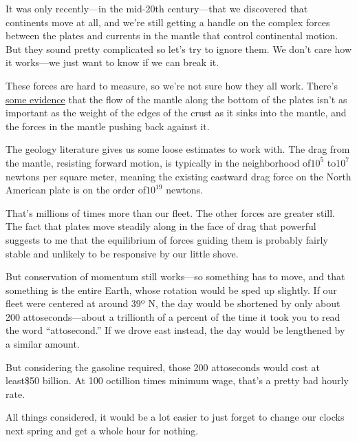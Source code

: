 {It was only recently—in the mid-20th century—that we discovered that continents move at all, and we’re still getting a handle on the complex forces between the plates and currents in the mantle that control continental motion. But they sound pretty complicated so let’s try to ignore them. We don’t care how it works—we just want to know if we can break it.}

{These forces are hard to measure, so we’re not sure how they all work. There’s \href{http://www.umich.edu/\~gs265/tecpaper.htm}{some evidence} that the flow of the mantle along the bottom of the plates isn’t as important as the weight of the edges of the crust as it sinks into the mantle, and the forces in the mantle pushing back against it.}

{The geology literature gives us some loose estimates to work with. The drag from the mantle, resisting forward motion, is typically in the neighborhood of\(10^5\) to\(10^7\) newtons per square meter, meaning the existing eastward drag force on the North American plate is on the order of\(10^{19}\) newtons.}

{That’s millions of times more than our fleet. The other forces are greater still. The fact that plates move steadily along in the face of drag that powerful suggests to me that the equilibrium of forces guiding them is probably fairly stable and unlikely to be responsive by our little shove.}

{But conservation of momentum still works—so something has to move, and that something is the entire Earth, whose rotation would be sped up slightly. If our fleet were centered at around 39º N, the day would be shortened by only about 200 attoseconds—about a trillionth of a percent of the time it took you to read the word “attosecond.” If we drove east instead, the day would be lengthened by a similar amount.}

{But considering the gasoline required, those 200 attoseconds would cost at least\$50 billion. At 100 octillion times minimum wage, that’s a pretty bad hourly rate.}

{All things considered, it would be a lot easier to just forget to change our clocks next spring and get a whole hour for nothing.}

